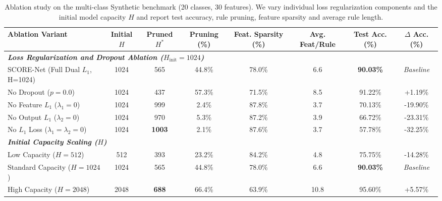 \begin{table}[t]
\centering
\caption{Ablation study on the multi-class Synthetic benchmark (20 classes, 30 features). We vary individual loss regularization components and the initial model capacity $H$ and report test accuracy, rule pruning, feature sparsity and average rule length.}
\label{tab:ablation_synthetic}
\setlength{\tabcolsep}{3pt}
\begin{tabular}{l ccc ccc c}
\toprule
\textbf{Ablation Variant} & \textbf{Initial $H$} & \textbf{Pruned $H^*$} & \textbf{Pruning (\%)} & \textbf{Feat. Sparsity (\%)} & \textbf{Avg. Feat/Rule} & \textbf{Test Acc. (\%)} & \textbf{$\Delta$ Acc. (\%)} \\
\midrule
\multicolumn{8}{l}{\textit{\textbf{Loss Regularization and Dropout Ablation ($H_{\text{init}}=1024$)}}} \\
SCORE-Net (Full Dual $L_1$, H=1024) & 1024 & 565 & 44.8\% & 78.0\% & 6.6 & \textbf{90.03\%} & \textit{Baseline} \\
No Dropout ($p = 0.0$) & 1024 & 437 & 57.3\% & 71.5\% & 8.5 & 91.22\% & +1.19\% \\
No Feature $L_1$ ($\lambda_1 = 0$) & 1024 & 999 & 2.4\% & 87.8\% & 3.7 & 70.13\% & -19.90\% \\
No Output $L_1$ ($\lambda_2 = 0$) & 1024 & 970 & 5.3\% & 87.2\% & 3.9 & 66.72\% & -23.31\% \\
No $L_1$ Loss ($\lambda_1 = \lambda_2 = 0$) & 1024 & \textbf{1003} & 2.1\% & 87.6\% & 3.7 & 57.78\% & -32.25\% \\
\midrule
\multicolumn{8}{l}{\textit{\textbf{Initial Capacity Scaling ($H$)}}} \\
Low Capacity ($H=512$) & 512 & 393 & 23.2\% & 84.2\% & 4.8 & 75.75\% & -14.28\% \\
Standard Capacity ($H=1024$) & 1024 & 565 & 44.8\% & 78.0\% & 6.6 & \textbf{90.03\%} & \textit{Baseline} \\
High Capacity ($H=2048$) & 2048 & \textbf{688} & 66.4\% & 63.9\% & 10.8 & 95.60\% & +5.57\% \\
\bottomrule
\end{tabular}
\end{table}
